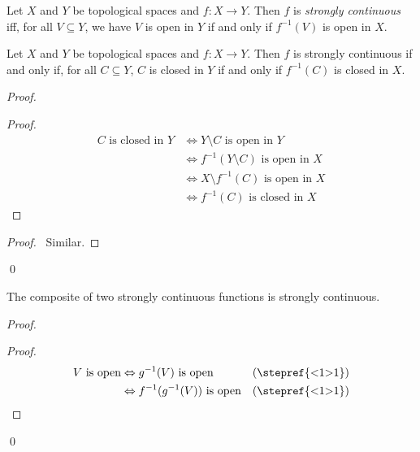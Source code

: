 \begin{df}
  Let $X$ and $Y$ be topological spaces and $f : X \rightarrow Y$. Then $f$
  is
  \emph{strongly continuous} iff, for all $V \subseteq Y$, we have $V$ is
  open
  in $Y$ if and only if $f^{-1}(V)$ is open in $X$.
\end{df}

\begin{prop}
  \label{prop:topology:strongly_continuous:closed}
  Let $X$ and $Y$ be topological spaces and $f : X \rightarrow Y$. Then $f$
  is
  strongly continuous if and only if, for all $C \subseteq Y$, $C$ is closed
  in
  $Y$ if and only if $f^{-1}(C)$ is closed in $X$.
\end{prop}

\begin{proof}
  \pf
  \begin{proof}
    \pf
    \begin{align*}
      C \text{ is closed in } Y & \Leftrightarrow Y \setminus C \text{ is
        open in } Y \\
      & \Leftrightarrow f^{-1}(Y \setminus C) \text{ is open in } X \\
      & \Leftrightarrow X \setminus f^{-1}(C) \text{ is open in } X \\
      & \Leftrightarrow f^{-1}(C) \text{ is closed in } X
    \end{align*}
  \end{proof}
  \begin{proof}
    \pf\ Similar.
  \end{proof}
  \qed
\end{proof}

\begin{prop}
  \label{prop:topology:strongly_continuous:composite}
  The composite of two strongly continuous functions is strongly continuous.
\end{prop}

\begin{proof}
  \pf
  \begin{proof}
    \pf
    \begin{align*}
      V \text{ is open} & \Leftrightarrow g^{-1}(V) \text{ is open} &
      (\text{\stepref{<1>1}}) \\
      & \Leftrightarrow f^{-1}(g^{-1}(V)) \text{ is open} &
      (\text{\stepref{<1>1}})
    \end{align*}
  \end{proof}
  \qed
\end{proof}

